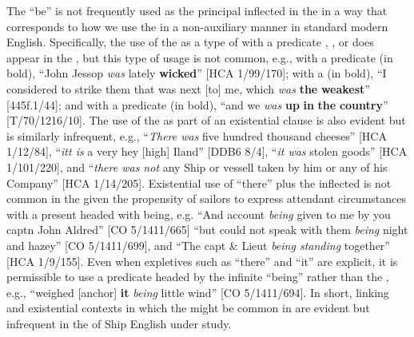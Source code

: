 The  “be” is not frequently used as the principal inflected  in the  in a way that corresponds to how we use the  in a non-auxiliary manner in standard modern English. Specifically, the use of the  as a type of  with a predicate , , or  does appear in the , but this type of usage is not common, e.g., with a predicate  (in bold), “John Jessop \textit{was} lately \textbf{wicked}” [HCA 1/99/170]; with a  (in bold), “I considered to strike them that was next [to] me, which \textit{was} \textbf{the} \textbf{weakest}” [445f.1/44]; and with a predicate  (in bold), “and we \textit{was} \textbf{up} \textbf{in} \textbf{the} \textbf{country}” [T/70/1216/10]. The use of the  as part of an existential clause is also evident but is similarly infrequent, e.g., “\textit{There was} five hundred thousand cheeses” [HCA 1/12/84], “\textit{itt is} a very hey [high] Iland” [DDB6 8/4], “\textit{it was} stolen goods” [HCA 1/101/220], and “\textit{there was not} any Ship or vessell taken by him or any of his Company” [HCA 1/14/205]. Existential use of “there” plus the inflected  is not common in the  given the propensity of sailors to express attendant circumstances with a present  headed with being, e.g. “And account \textit{being} given to me by you captn John Aldred” [CO 5/1411/665] “but could not speak with them \textit{being} night and hazey” [CO 5/1411/699], and “The capt \& Lieut \textit{being standing} together” [HCA 1/9/155]. Even when expletives such as “there” and “it” are explicit, it is permissible to use a predicate headed by the infinite  “being” rather than the , e.g., “weighed [anchor] \textbf{it} \textit{being} little wind” [CO 5/1411/694]. In short, linking and existential contexts in which the  might be common in  are evident but infrequent in the  of Ship English under study. 

